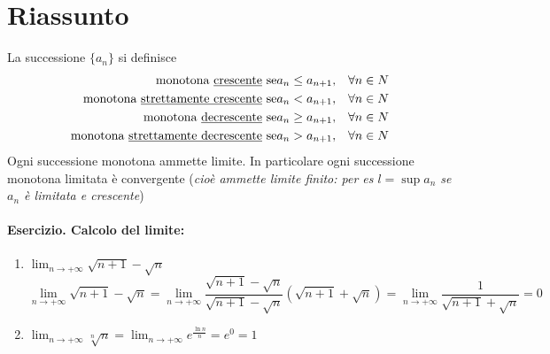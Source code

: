 \section{Riassunto}
La successione $\{a_n\}$ si definisce
\begin{eqnarray*}
	\text{monotona \underline{crescente} se}&a_n\leq a_{n+1},&\forall n \in N\\
	\text{monotona \underline{strettamente crescente} se}&a_n<a_{n+1},&\forall n \in N\\
	\text{monotona \underline{decrescente} se}&a_n\geq a_{n+1},&\forall n \in N\\
	\text{monotona \underline{strettamente decrescente} se}&a_n> a_{n+1},&\forall n \in N
\end{eqnarray*}
Ogni successione monotona ammette limite. In particolare ogni successione monotona limitata è convergente (\textit{cioè ammette limite finito: per es $l=\sup a_n$ se $a_n$ è limitata e crescente})
\paragraph{Esercizio. Calcolo del limite:}
\begin{enumerate}
	\item $\lim_{n\to+\infty}\sqrt{n+1}-\sqrt{n}$
	\begin{equation*}
		\lim_{n\to+\infty}\sqrt{n+1}-\sqrt{n}=\lim_{n\to+\infty}\frac{\sqrt{n+1}-\sqrt{n}}{\sqrt{n+1}-\sqrt{n}}(\sqrt{n+1}+\sqrt{n})=\lim_{n\to+\infty}\frac{1}{\sqrt{n+1}+\sqrt{n}}=0
	\end{equation*}
	\item $\lim_{n\to+\infty}\sqrt[n]{n}=\lim_{n\to+\infty}e^{\frac{\ln n}{n}}=e^0=1$
	
\end{enumerate}


